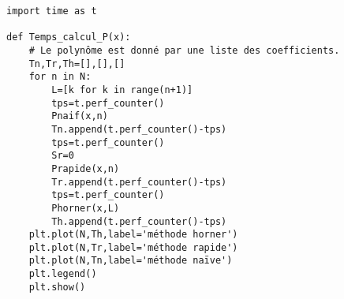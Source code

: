 \begin{lstlisting}
import time as t

def Temps_calcul_P(x):
    # Le polynôme est donné par une liste des coefficients.
    Tn,Tr,Th=[],[],[]
    for n in N:
        L=[k for k in range(n+1)]
        tps=t.perf_counter()
        Pnaif(x,n)
        Tn.append(t.perf_counter()-tps)
        tps=t.perf_counter()
        Sr=0
        Prapide(x,n)
        Tr.append(t.perf_counter()-tps)
        tps=t.perf_counter()
        Phorner(x,L)
        Th.append(t.perf_counter()-tps)
    plt.plot(N,Th,label='méthode horner')
    plt.plot(N,Tr,label='méthode rapide')
    plt.plot(N,Tn,label='méthode naïve')
    plt.legend()
    plt.show()

\end{lstlisting}
	
